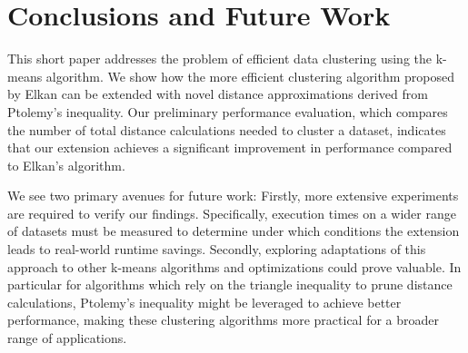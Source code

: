 \section{Conclusions and Future Work} \label{sec: conclusions}
This short paper addresses the problem of efficient data clustering using the k-means algorithm.
We show how the more efficient clustering algorithm proposed by Elkan can be extended with novel distance approximations derived from Ptolemy's inequality.
Our preliminary performance evaluation, which compares the number of total distance calculations needed to cluster a dataset, indicates that our extension achieves a significant improvement in performance compared to Elkan's algorithm.

We see two primary avenues for future work:
Firstly, more extensive experiments are required to verify our findings.
Specifically, execution times on a wider range of datasets must be measured to determine under which conditions the extension leads to real-world runtime savings.
Secondly, exploring adaptations of this approach to other k-means algorithms and optimizations could prove valuable.
In particular for algorithms which rely on the triangle inequality to prune distance calculations, Ptolemy's inequality might be leveraged to achieve better performance, making these clustering algorithms more practical for a broader range of applications.






